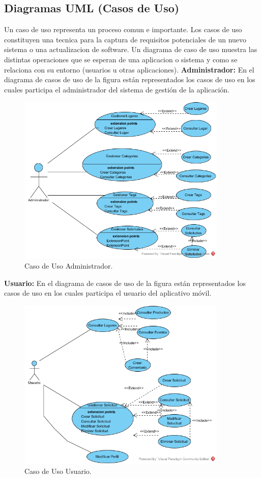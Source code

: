 \documentclass[12pt,letterpaper,openany]{book}
\begin{document}
\subsection{Diagramas UML (Casos de Uso)}
Un caso de uso representa un proceso comun e importante. Los casos de uso constituyen una tecnica para la captura de requisitos potenciales de un nuevo sistema o una actualizacion de software. Un diagrama de caso de uso muestra las distintas operaciones que se esperan de una aplicacion o sistema y como se relaciona con su entorno (usuarios u otras aplicaciones).
\vspace{5mm}\newline
\textbf{Administrador:} En el diagrama de casos de uso de la figura están representados los casos de uso en los cuales participa el administrador del sistema de gestión de la aplicación.
\begin{figure}[H]
\begin{center}
\includegraphics[width=10cm]{./imagenes/CU/cu_administrador}
\caption{Caso de Uso Administrador.}
\end{center}
\end{figure}

\textbf{Usuario:} En el diagrama de casos de uso de la figura están representados los casos de uso en los cuales participa el usuario del aplicativo móvil.
\begin{figure}[H]
\begin{center}
\includegraphics[width=10cm]{./imagenes/CU/cu_usuario}
\caption{Caso de Uso Usuario.}
\end{center}
\end{figure}
\end{document}
